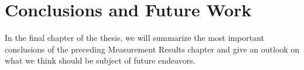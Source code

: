 \chapter{Conclusions and Future Work}

In the final chapter of the thesis, we will summarize the most important conclusions of the preceding Measurement Results chapter and give an outlook on what we think should be subject of future endeavors.

